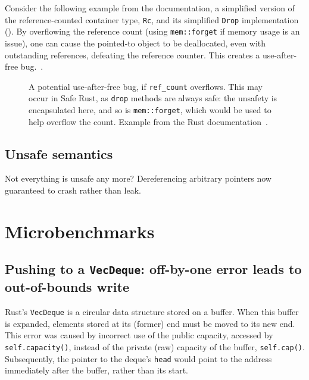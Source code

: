 \documentclass[dissertation.tex]{subfiles}
\begin{document}
Consider the following example from the documentation, a simplified
version of the reference-counted container type, \texttt{Rc}, and its
simplified \texttt{Drop} implementation ().
By overflowing the reference count (using \texttt{mem::forget} if memory
usage is an issue), one can cause the pointed-to object to be
deallocated, even with outstanding references, defeating the reference
counter.
This creates a use-after-free bug.~\cite{rust-nomicon-rc-leak}.

\begin{figure}[ht]
    
    \caption{
        A potential use-after-free bug, if \texttt{ref\_count}
        overflows.
        This may occur in Safe Rust, as \texttt{drop} methods are always
        safe: the unsafety is encapsulated here, and so is
        \texttt{mem::forget}, which would be used to help overflow the count.
        Example from the Rust documentation~\cite{rust-nomicon-rc-leak}.
    }
    \label{lst:eval-rust-rc-drop}
\end{figure}



\subsection{Unsafe semantics}
Not everything is unsafe any more? Dereferencing arbitrary pointers now
guaranteed to crash rather than leak.


\section{Microbenchmarks}
\label{sec:eval-micro}




\subsection{Pushing to a \texttt{VecDeque}: off-by-one error leads to out-of-bounds write}
\label{sec:eval-micro-push}

Rust's \texttt{VecDeque} is a circular data structure stored on a
buffer.
When this buffer is expanded, elements stored at its (former) end must
be moved to its new end.
This error was caused by incorrect use of the public capacity, accessed
by \texttt{self.capacity()}, instead of the private (raw) capacity of
the buffer, \texttt{self.cap()}.
Subsequently, the pointer to the deque's \texttt{head} would point to
the address immediately after the buffer, rather than its start.
\end{document}
